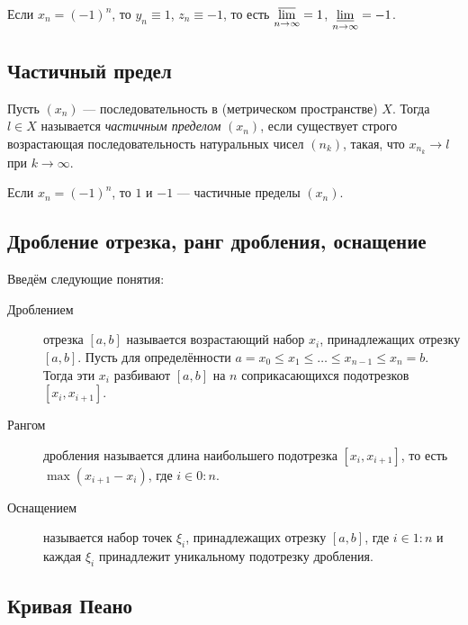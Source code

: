 \begin{example}
	Если \(x_n = (-1)^n\), то \(y_n \equiv 1\), \(z_n \equiv -1\), то есть \(\varlimsup\limits_{n \to \infty} = 1\), \(\varliminf\limits_{n \to \infty} = -1\).
\end{example}

\subsection{Частичный предел}

\begin{definition}
	Пусть \((x_n)\) --- последовательность в (метрическом пространстве) \(X\). Тогда \(l \in X\) называется \textit{частичным пределом} \((x_n)\), если существует строго возрастающая последовательность натуральных чисел \((n_k)\), такая, что \(x_{n_k} \to l\) при \(k \to \infty\).
\end{definition}

\begin{example}
	Если \(x_n = (-1)^n\), то \(1\) и \(-1\) --- частичные пределы \((x_n)\).
\end{example}

\subsection{Дробление отрезка, ранг дробления, оснащение}

\begin{definition}
	Введём следующие понятия:
	\begin{description}
		\item[Дроблением] отрезка \([a, b]\) называется возрастающий набор \(x_i\), принадлежащих отрезку \([a, b]\). Пусть для определённости \linebreak \(a = x_0 \leqslant x_1 \leqslant \ldots \leqslant x_{n - 1} \leqslant x_n = b\). Тогда эти \(x_i\) разбивают \([a, b]\) на \(n\) соприкасающихся подотрезков \([x_i, x_{i + 1}]\).
		\item[Рангом] дробления называется длина наибольшего подотрезка \([x_i, x_{i + 1}]\), то есть \(\max (x_{i + 1} - x_i)\), где \(i \in 0 : n\).
		\item[Оснащением] называется набор точек \(\xi_i\), принадлежащих отрезку \([a, b]\), где \(i \in 1 : n\) и каждая \(\xi_i\) принадлежит уникальному подотрезку дробления.
	\end{description}
\end{definition}

\subsection{Кривая Пеано}

